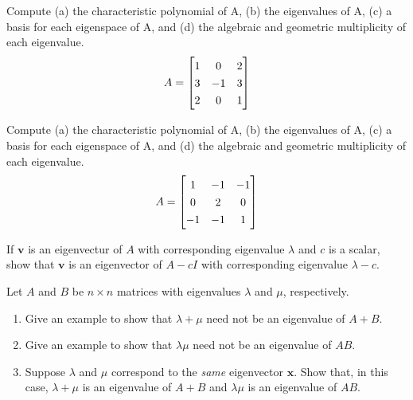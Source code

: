 \documentclass[12pt,letterpaper]{hmcpset}
\newcommand{\m}[1]{\renewcommand*{\arraystretch}{1.3} \begin{bmatrix} #1 \end{bmatrix}}
\begin{document}

\begin{problem}[4.3.6]
	Compute (a) the characteristic polynomial of A, (b) the eigenvalues of A, (c) a basis for each eigenspace of A, and (d) the algebraic and geometric multiplicity of each eigenvalue.
  $$ A = \m{1 & 0 & 2 \\ 3 & -1 & 3 \\ 2 & 0 & 1} $$
\end{problem}

\begin{solution}
\vfill
\end{solution}
\newpage

\begin{problem}[4.3.8]
	Compute (a) the characteristic polynomial of A, (b) the eigenvalues of A, (c) a basis for each eigenspace of A, and (d) the algebraic and geometric multiplicity of each eigenvalue.
  $$ A = \m{1 & -1 & -1 \\ 0 & 2 & 0 \\ -1 & -1 & 1} $$
\end{problem}

\begin{solution}
\vfill
\end{solution}
\newpage

\begin{problem}[4.3.22]
	If $\mathbf{v}$ is an eigenvectur of $A$ with corresponding eigenvalue $\lambda$ and $c$ is a scalar, show that $\mathbf{v}$ is an eigenvector of $A - cI$ with corresponding eigenvalue $\lambda - c$.
\end{problem}

\begin{solution}
\vfill
\end{solution}
\newpage

\begin{problem}[4.3.24]
Let $A$ and $B$ be $n \times n$ matrices with eigenvalues $\lambda$ and $\mu$, respectively.
	\begin{enumerate}
		\item
			Give an example to show that $\lambda + \mu$ need not be an eigenvalue of $A+B$.
		\item
			Give an example to show that $\lambda\mu$ need not be an eigenvalue of $AB$.
		\item
			Suppose $\lambda$ and $\mu$ correspond to the \emph{same} eigenvector $\mathbf{x}$. Show that, in this case, $\lambda + \mu$ is an eigenvalue of $A+B$ and $\lambda\mu$ is an eigenvalue of $AB$.
	\end{enumerate}

\end{problem}
\end{document}

